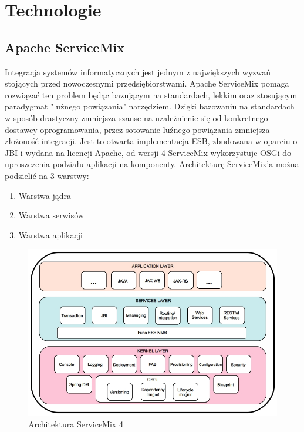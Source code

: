 \ifpdf
    \graphicspath{{2/figures/PNG/}{2/figures/PDF/}{2/figures/}}
\else
    \graphicspath{{2/figures/EPS/}{2/figures/}}
\fi
\chapter{Technologie} %



\section{Apache ServiceMix}
Integracja systemów informatycznych jest jednym z największych wyzwań stojących przed nowoczesnymi przedsiębiorstwami. Apache ServiceMix pomaga rozwiązać ten problem będąc bazującym na standardach, lekkim oraz stosującym paradygmat "luźnego powiązania" narzędziem. Dzięki bazowaniu na standardach w sposób drastyczny zmniejsza szanse na uzależnienie się od konkretnego dostawcy oprogramowania, przez sotowanie luźnego-powiązania zmniejsza złożoność integracji. 
Jest to otwarta implementacja ESB, zbudowana w oparciu o JBI i wydana na licencji Apache, od wersji 4 ServiceMix wykorzystuje OSGi do uproszczenia podziału aplikacji na komponenty. 	
Architekturę ServiceMix'a można podzielić na 3 warstwy:
\begin{enumerate}
	\item Warstwa jądra
	\item Warstwa serwisów
	\item Warstwa aplikacji
\end{enumerate}  
\newpage
\begin{figure}[!h]
	\centering
	\includegraphics[scale=0.45]{ServiceMixArchitektura.jpg} 
	\caption{Architektura ServiceMix 4}
\end{figure}
